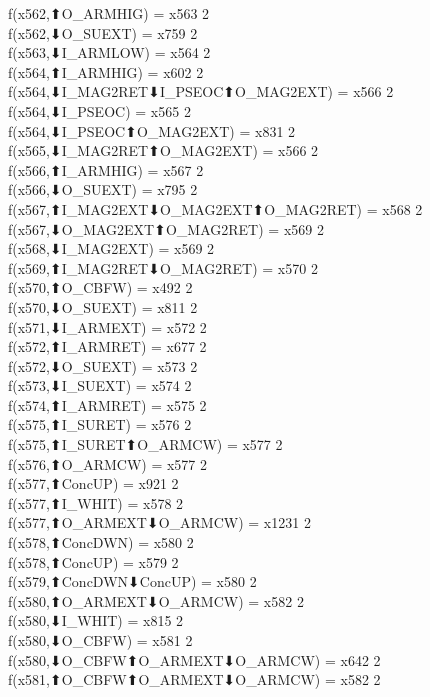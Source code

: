 f(x562,⬆O_ARMHIG) = x563 {2} \\
f(x562,⬇O_SUEXT) = x759 {2} \\
f(x563,⬇I_ARMLOW) = x564 {2} \\
f(x564,⬆I_ARMHIG) = x602 {2} \\
f(x564,⬇I_MAG2RET⬇I_PSEOC⬆O_MAG2EXT) = x566 {2} \\
f(x564,⬇I_PSEOC) = x565 {2} \\
f(x564,⬇I_PSEOC⬆O_MAG2EXT) = x831 {2} \\
f(x565,⬇I_MAG2RET⬆O_MAG2EXT) = x566 {2} \\
f(x566,⬆I_ARMHIG) = x567 {2} \\
f(x566,⬇O_SUEXT) = x795 {2} \\
f(x567,⬆I_MAG2EXT⬇O_MAG2EXT⬆O_MAG2RET) = x568 {2} \\
f(x567,⬇O_MAG2EXT⬆O_MAG2RET) = x569 {2} \\
f(x568,⬇I_MAG2EXT) = x569 {2} \\
f(x569,⬆I_MAG2RET⬇O_MAG2RET) = x570 {2} \\
f(x570,⬆O_CBFW) = x492 {2} \\
f(x570,⬇O_SUEXT) = x811 {2} \\
f(x571,⬇I_ARMEXT) = x572 {2} \\
f(x572,⬆I_ARMRET) = x677 {2} \\
f(x572,⬇O_SUEXT) = x573 {2} \\
f(x573,⬇I_SUEXT) = x574 {2} \\
f(x574,⬆I_ARMRET) = x575 {2} \\
f(x575,⬆I_SURET) = x576 {2} \\
f(x575,⬆I_SURET⬆O_ARMCW) = x577 {2} \\
f(x576,⬆O_ARMCW) = x577 {2} \\
f(x577,⬆ConcUP) = x921 {2} \\
f(x577,⬆I_WHIT) = x578 {2} \\
f(x577,⬆O_ARMEXT⬇O_ARMCW) = x1231 {2} \\
f(x578,⬆ConcDWN) = x580 {2} \\
f(x578,⬆ConcUP) = x579 {2} \\
f(x579,⬆ConcDWN⬇ConcUP) = x580 {2} \\
f(x580,⬆O_ARMEXT⬇O_ARMCW) = x582 {2} \\
f(x580,⬇I_WHIT) = x815 {2} \\
f(x580,⬇O_CBFW) = x581 {2} \\
f(x580,⬇O_CBFW⬆O_ARMEXT⬇O_ARMCW) = x642 {2} \\
f(x581,⬆O_CBFW⬆O_ARMEXT⬇O_ARMCW) = x582 {2} \\
